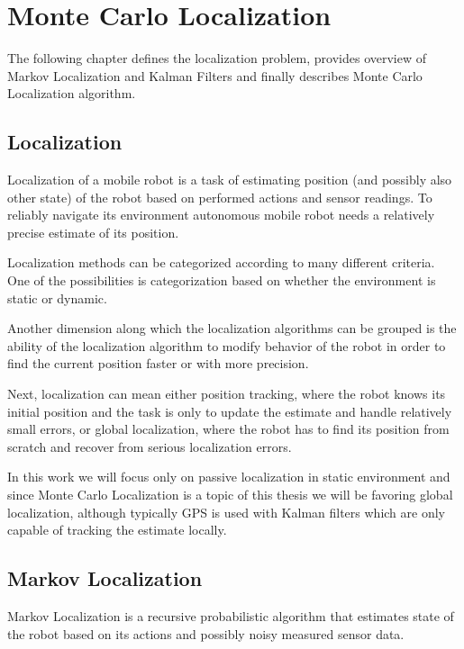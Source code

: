 \chapter{Monte Carlo Localization}
\label{chap:mcl}

The following chapter defines the localization problem, provides overview
of Markov Localization and Kalman Filters and finally describes
Monte Carlo Localization algorithm.

\section{Localization}
Localization of a mobile robot is a task of estimating position (and possibly
also other state) of the robot based on performed actions and sensor readings.
To reliably navigate its environment autonomous mobile robot needs
a relatively precise estimate of its position.

Localization methods can be categorized according to many different criteria.
One of the possibilities is categorization based on whether the environment is static
or dynamic.

Another dimension along which the localization algorithms can be grouped
is the ability of the localization algorithm to modify behavior of the robot
in order to find the current position faster or with more precision.

Next, localization can mean either position tracking, where the robot knows its initial
position and the task is only to update the estimate and handle relatively small
errors, or global localization, where the robot has to find its position from scratch
and recover from serious localization errors.

In this work we will focus only on passive localization in static environment and
since Monte Carlo Localization is a topic of this thesis we will be favoring
global localization, although typically GPS is used with Kalman filters
which are only capable of tracking the estimate locally.

\section{Markov Localization}

Markov Localization \cite{fox98,diard03} is a recursive probabilistic
algorithm that estimates state of the robot based on its
actions and possibly noisy measured sensor data.

